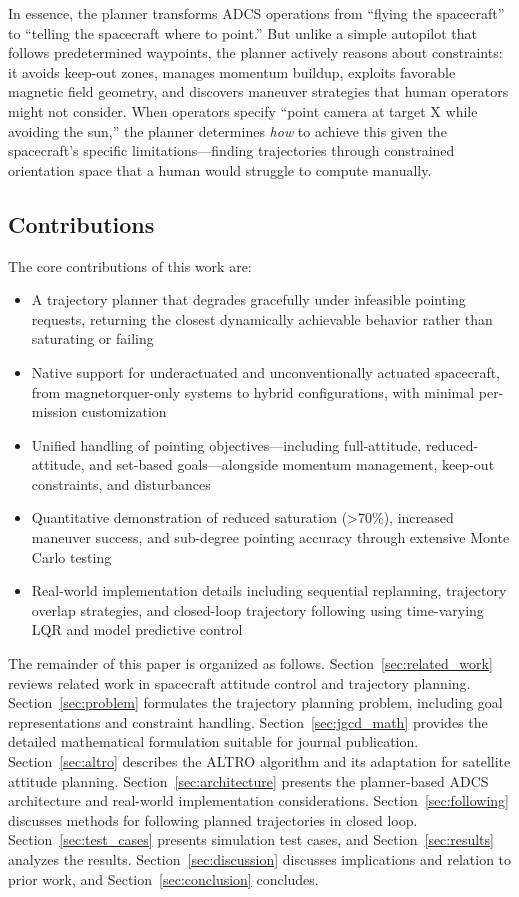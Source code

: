 \documentclass[conference]{IEEEtran}
\begin{document}
In essence, the planner transforms ADCS operations from ``flying the spacecraft'' to ``telling the spacecraft where to point.'' But unlike a simple autopilot that follows predetermined waypoints, the planner actively reasons about constraints: it avoids keep-out zones, manages momentum buildup, exploits favorable magnetic field geometry, and discovers maneuver strategies that human operators might not consider. When operators specify ``point camera at target X while avoiding the sun,'' the planner determines \emph{how} to achieve this given the spacecraft's specific limitations---finding trajectories through constrained orientation space that a human would struggle to compute manually.

\subsection{Contributions}\label{subsec:contributions}
The core contributions of this work are:
\begin{itemize}
    \item A trajectory planner that degrades gracefully under infeasible pointing requests, returning the closest dynamically achievable behavior rather than saturating or failing
    \item Native support for underactuated and unconventionally actuated spacecraft, from magnetorquer-only systems to hybrid configurations, with minimal per-mission customization
    \item Unified handling of pointing objectives---including full-attitude, reduced-attitude, and set-based goals---alongside momentum management, keep-out constraints, and disturbances
    \item Quantitative demonstration of reduced saturation (>70\%), increased maneuver success, and sub-degree pointing accuracy through extensive Monte Carlo testing
    \item Real-world implementation details including sequential replanning, trajectory overlap strategies, and closed-loop trajectory following using time-varying LQR and model predictive control
\end{itemize}

The remainder of this paper is organized as follows. Section~\ref{sec:related_work} reviews related work in spacecraft attitude control and trajectory planning. Section~\ref{sec:problem} formulates the trajectory planning problem, including goal representations and constraint handling. Section~\ref{sec:jgcd_math} provides the detailed mathematical formulation suitable for journal publication. Section~\ref{sec:altro} describes the ALTRO algorithm and its adaptation for satellite attitude planning. Section~\ref{sec:architecture} presents the planner-based ADCS architecture and real-world implementation considerations. Section~\ref{sec:following} discusses methods for following planned trajectories in closed loop. Section~\ref{sec:test_cases} presents simulation test cases, and Section~\ref{sec:results} analyzes the results. Section~\ref{sec:discussion} discusses implications and relation to prior work, and Section~\ref{sec:conclusion} concludes.
\end{document}
